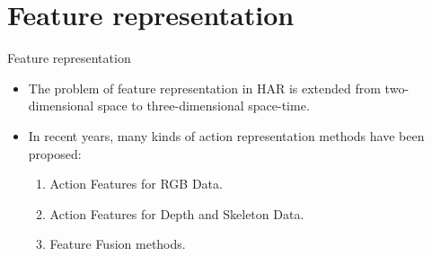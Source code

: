 \section{Feature representation}
\begin{frame}{Feature representation}
    \begin{itemize}
        \item The problem of feature representation in HAR is extended from two-dimensional space to three-dimensional space-time.
        \item In recent years, many kinds of action representation methods have been proposed:
              \begin{enumerate}
                  \item Action Features for RGB Data.
                  \item Action Features for Depth and Skeleton Data.
                  \item Feature Fusion methods.
              \end{enumerate}
    \end{itemize}
\end{frame}

